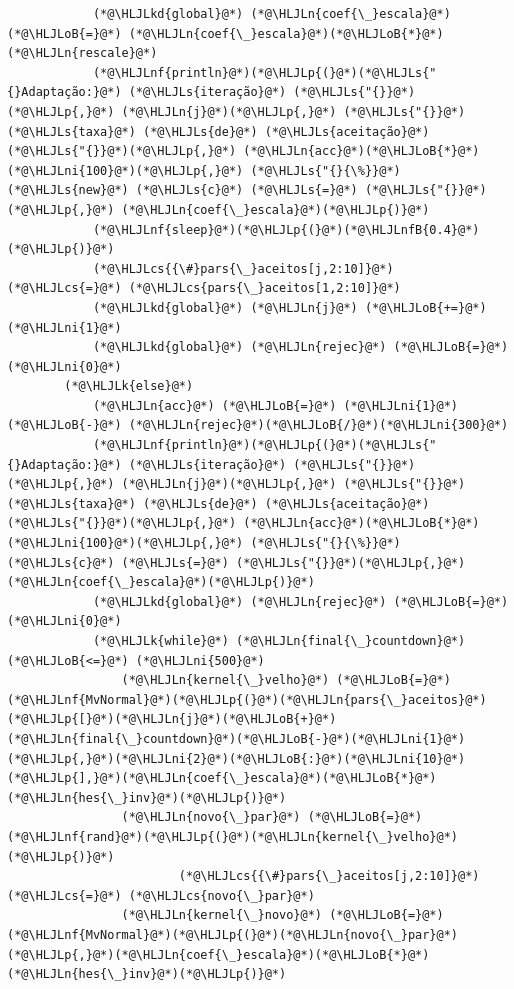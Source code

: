 \documentclass[12pt,a4paper]{article}
\newcommand{\HLJLk}[1]{\textcolor[RGB]{148,91,176}{\textbf{#1}}}
\newcommand{\HLJLkd}[1]{\textcolor[RGB]{214,102,97}{\textit{#1}}}
\newcommand{\HLJLn}[1]{#1}
\newcommand{\HLJLnf}[1]{\textcolor[RGB]{66,102,213}{#1}}
\newcommand{\HLJLs}[1]{\textcolor[RGB]{201,61,57}{#1}}
\newcommand{\HLJLnfB}[1]{\textcolor[RGB]{59,151,46}{#1}}
\newcommand{\HLJLni}[1]{\textcolor[RGB]{59,151,46}{#1}}
\newcommand{\HLJLoB}[1]{\textcolor[RGB]{102,102,102}{\textbf{#1}}}
\newcommand{\HLJLp}[1]{#1}
\newcommand{\HLJLcs}[1]{\textcolor[RGB]{153,153,119}{\textit{#1}}}
\begin{document}
\begin{lstlisting}
            (*@\HLJLkd{global}@*) (*@\HLJLn{coef{\_}escala}@*) (*@\HLJLoB{=}@*) (*@\HLJLn{coef{\_}escala}@*)(*@\HLJLoB{*}@*)(*@\HLJLn{rescale}@*)
            (*@\HLJLnf{println}@*)(*@\HLJLp{(}@*)(*@\HLJLs{"{}Adaptação:}@*) (*@\HLJLs{iteração}@*) (*@\HLJLs{"{}}@*)(*@\HLJLp{,}@*) (*@\HLJLn{j}@*)(*@\HLJLp{,}@*) (*@\HLJLs{"{}}@*) (*@\HLJLs{taxa}@*) (*@\HLJLs{de}@*) (*@\HLJLs{aceitação}@*) (*@\HLJLs{"{}}@*)(*@\HLJLp{,}@*) (*@\HLJLn{acc}@*)(*@\HLJLoB{*}@*)(*@\HLJLni{100}@*)(*@\HLJLp{,}@*) (*@\HLJLs{"{}{\%}}@*) (*@\HLJLs{new}@*) (*@\HLJLs{c}@*) (*@\HLJLs{=}@*) (*@\HLJLs{"{}}@*)(*@\HLJLp{,}@*) (*@\HLJLn{coef{\_}escala}@*)(*@\HLJLp{)}@*)
            (*@\HLJLnf{sleep}@*)(*@\HLJLp{(}@*)(*@\HLJLnfB{0.4}@*)(*@\HLJLp{)}@*)
            (*@\HLJLcs{{\#}pars{\_}aceitos[j,2:10]}@*) (*@\HLJLcs{=}@*) (*@\HLJLcs{pars{\_}aceitos[1,2:10]}@*)
            (*@\HLJLkd{global}@*) (*@\HLJLn{j}@*) (*@\HLJLoB{+=}@*) (*@\HLJLni{1}@*)
            (*@\HLJLkd{global}@*) (*@\HLJLn{rejec}@*) (*@\HLJLoB{=}@*) (*@\HLJLni{0}@*)
        (*@\HLJLk{else}@*)
            (*@\HLJLn{acc}@*) (*@\HLJLoB{=}@*) (*@\HLJLni{1}@*) (*@\HLJLoB{-}@*) (*@\HLJLn{rejec}@*)(*@\HLJLoB{/}@*)(*@\HLJLni{300}@*)
            (*@\HLJLnf{println}@*)(*@\HLJLp{(}@*)(*@\HLJLs{"{}Adaptação:}@*) (*@\HLJLs{iteração}@*) (*@\HLJLs{"{}}@*)(*@\HLJLp{,}@*) (*@\HLJLn{j}@*)(*@\HLJLp{,}@*) (*@\HLJLs{"{}}@*) (*@\HLJLs{taxa}@*) (*@\HLJLs{de}@*) (*@\HLJLs{aceitação}@*) (*@\HLJLs{"{}}@*)(*@\HLJLp{,}@*) (*@\HLJLn{acc}@*)(*@\HLJLoB{*}@*)(*@\HLJLni{100}@*)(*@\HLJLp{,}@*) (*@\HLJLs{"{}{\%}}@*) (*@\HLJLs{c}@*) (*@\HLJLs{=}@*) (*@\HLJLs{"{}}@*)(*@\HLJLp{,}@*) (*@\HLJLn{coef{\_}escala}@*)(*@\HLJLp{)}@*)
            (*@\HLJLkd{global}@*) (*@\HLJLn{rejec}@*) (*@\HLJLoB{=}@*) (*@\HLJLni{0}@*)
            (*@\HLJLk{while}@*) (*@\HLJLn{final{\_}countdown}@*) (*@\HLJLoB{<=}@*) (*@\HLJLni{500}@*)
                (*@\HLJLn{kernel{\_}velho}@*) (*@\HLJLoB{=}@*) (*@\HLJLnf{MvNormal}@*)(*@\HLJLp{(}@*)(*@\HLJLn{pars{\_}aceitos}@*)(*@\HLJLp{[}@*)(*@\HLJLn{j}@*)(*@\HLJLoB{+}@*)(*@\HLJLn{final{\_}countdown}@*)(*@\HLJLoB{-}@*)(*@\HLJLni{1}@*)(*@\HLJLp{,}@*)(*@\HLJLni{2}@*)(*@\HLJLoB{:}@*)(*@\HLJLni{10}@*)(*@\HLJLp{],}@*)(*@\HLJLn{coef{\_}escala}@*)(*@\HLJLoB{*}@*)(*@\HLJLn{hes{\_}inv}@*)(*@\HLJLp{)}@*)
                (*@\HLJLn{novo{\_}par}@*) (*@\HLJLoB{=}@*) (*@\HLJLnf{rand}@*)(*@\HLJLp{(}@*)(*@\HLJLn{kernel{\_}velho}@*)(*@\HLJLp{)}@*)
                        (*@\HLJLcs{{\#}pars{\_}aceitos[j,2:10]}@*) (*@\HLJLcs{=}@*) (*@\HLJLcs{novo{\_}par}@*)
                (*@\HLJLn{kernel{\_}novo}@*) (*@\HLJLoB{=}@*) (*@\HLJLnf{MvNormal}@*)(*@\HLJLp{(}@*)(*@\HLJLn{novo{\_}par}@*)(*@\HLJLp{,}@*)(*@\HLJLn{coef{\_}escala}@*)(*@\HLJLoB{*}@*)(*@\HLJLn{hes{\_}inv}@*)(*@\HLJLp{)}@*)


\end{lstlisting}
\end{document}
